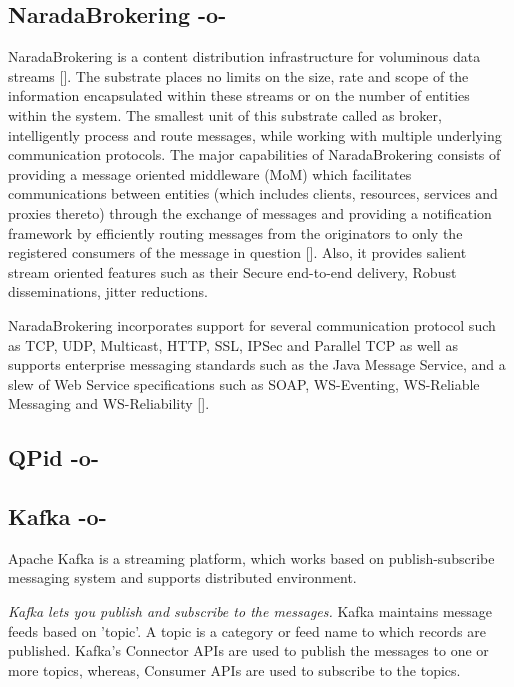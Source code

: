\subsection{NaradaBrokering -o-}

NaradaBrokering is a content distribution infrastructure for
voluminous data streams [\cite{www-narada}].  The substrate places no
limits on the size, rate and scope of the information encapsulated
within these streams or on the number of entities within the
system. The smallest unit of this substrate called as broker,
intelligently process and route messages, while working with multiple
underlying communication protocols. The major capabilities of
NaradaBrokering consists of providing a message oriented middleware
(MoM) which facilitates communications between entities (which
includes clients, resources, services and proxies thereto) through the
exchange of messages and providing a notification framework by
efficiently routing messages from the originators to only the
registered consumers of the message in
question [\cite{paper-nb-sustrate}]. Also, it provides salient stream
oriented features such as their Secure end-to-end delivery, Robust
disseminations, jitter reductions.

NaradaBrokering incorporates support for several communication
protocol such as TCP, UDP, Multicast, HTTP, SSL, IPSec and Parallel
TCP as well as supports enterprise messaging standards such as the
Java Message Service, and a slew of Web Service specifications such as
SOAP, WS-Eventing, WS-Reliable Messaging and
WS-Reliability [\cite{www-narada-features}].



     
\subsection{QPid -o-}



\subsection{Kafka -o-}

Apache Kafka is a streaming platform, which works based on
publish-subscribe messaging system and supports distributed
environment.
      
\textit{Kafka lets you publish and subscribe to the messages.}  Kafka
maintains message feeds based on 'topic'. A topic is a category or
feed name to which records are published. Kafka's Connector APIs are
used to publish the messages to one or more topics, whereas, Consumer
APIs are used to subscribe to the topics.

